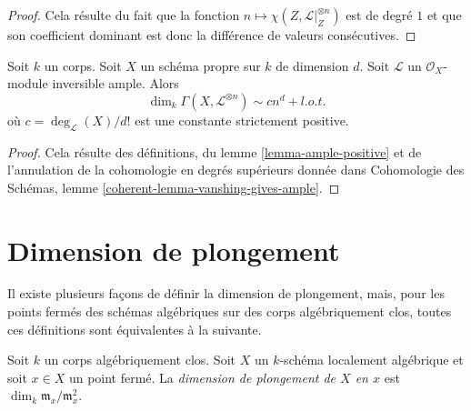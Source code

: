 \begin{proof}
Cela résulte du fait que la fonction
$n \mapsto \chi(Z, \mathcal{L}|_Z^{\otimes n})$ est de degré $1$
et que son coefficient dominant est donc la différence de valeurs consécutives.
\end{proof}

\begin{proposition}
\label{proposition-asymptotic-riemann-roch}
Soit $k$ un corps. Soit $X$ un schéma propre sur $k$ de dimension $d$.
Soit $\mathcal{L}$ un $\mathcal{O}_X$-module inversible ample.
Alors
$$
\dim_k \Gamma(X, \mathcal{L}^{\otimes n}) \sim c n^d + l.o.t.
$$
où $c = \deg_\mathcal{L}(X)/d!$ est une constante strictement positive.
\end{proposition}

\begin{proof}
Cela résulte des définitions,
du lemme \ref{lemma-ample-positive} et de l'annulation
de la cohomologie en degrés supérieurs donnée dans
Cohomologie des Schémas, lemme \ref{coherent-lemma-vanshing-gives-ample}.
\end{proof}






\section{Dimension de plongement}
\label{section-embedding-dimension}

\noindent
Il existe plusieurs façons de définir la dimension de plongement, mais, pour
les points fermés des schémas algébriques sur des corps algébriquement clos,
toutes ces définitions sont équivalentes à la suivante.

\begin{definition}
\label{definition-embed-dim}
Soit $k$ un corps algébriquement clos. Soit $X$ un
$k$-schéma localement algébrique et soit $x \in X$ un point fermé. La
{\it dimension de plongement de $X$ en $x$} est
$\dim_k \mathfrak m_x/\mathfrak m_x^2$.
\end{definition}

